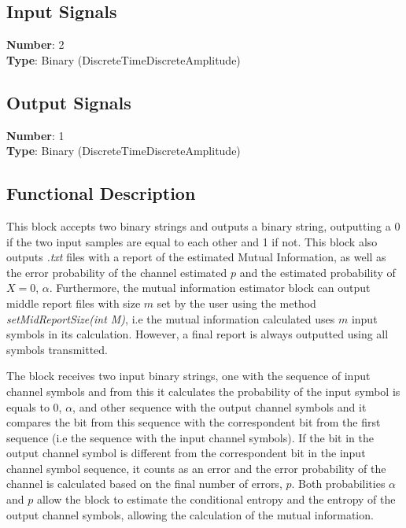 \begin{refsection}
\subsection*{Input Signals}

\textbf{Number}: 2\\
\textbf{Type}: Binary (DiscreteTimeDiscreteAmplitude)


\subsection*{Output Signals}

\textbf{Number}: 1\\
\textbf{Type}: Binary (DiscreteTimeDiscreteAmplitude)


\subsection*{Functional Description}

This block accepts two binary strings and outputs a binary string, outputting a 0 if the two input samples are equal to each other and 1 if not. This block also outputs \textit{.txt} files with a report of the estimated Mutual Information, as well as the error probability of the channel estimated $p$ and the estimated probability of $X=0$, $\alpha$.
Furthermore, the mutual information estimator block can output middle report files with size $m$ set by the user using the method \textit{setMidReportSize(int M)}, i.e the mutual information calculated uses $m$ input symbols in its calculation. However, a final report is always outputted using all symbols transmitted.

The block receives two input binary strings, one with the sequence of input channel symbols and from this it calculates the probability of the input symbol is equals to $0$, $\alpha$, and other sequence with the output channel symbols and it compares the bit from this sequence with the correspondent bit from the first sequence (i.e the sequence with the input channel symbols). If the bit in the output channel symbol is different from the correspondent bit in the input channel symbol sequence, it counts as an error and the error probability of the channel is calculated based on the final number of errors, $p$. Both probabilities $\alpha$ and $p$ allow the block to estimate the conditional entropy and the entropy of the output channel symbols, allowing the calculation of the mutual information.

\clearpage
\printbibliography[heading=subbibliography]
\end{refsection}
\cleardoublepage
